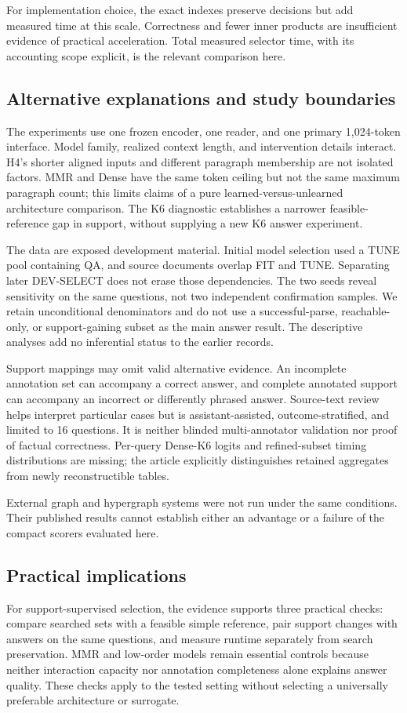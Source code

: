 \documentclass[preprint,12pt]{elsarticle}
\begin{document}
For implementation choice, the exact indexes preserve decisions but add measured time at this scale. Correctness and fewer inner products are insufficient evidence of practical acceleration. Total measured selector time, with its accounting scope explicit, is the relevant comparison here.

\subsection{Alternative explanations and study boundaries}
The experiments use one frozen encoder, one reader, and one primary 1,024-token interface. Model family, realized context length, and intervention details interact. H4's shorter aligned inputs and different paragraph membership are not isolated factors. MMR and Dense have the same token ceiling but not the same maximum paragraph count; this limits claims of a pure learned-versus-unlearned architecture comparison. The K6 diagnostic establishes a narrower feasible-reference gap in support, without supplying a new K6 answer experiment.

The data are exposed development material. Initial model selection used a TUNE pool containing QA, and source documents overlap FIT and TUNE. Separating later DEV-SELECT does not erase those dependencies. The two seeds reveal sensitivity on the same questions, not two independent confirmation samples. We retain unconditional denominators and do not use a successful-parse, reachable-only, or support-gaining subset as the main answer result. The descriptive analyses add no inferential status to the earlier records.

Support mappings may omit valid alternative evidence. An incomplete annotation set can accompany a correct answer, and complete annotated support can accompany an incorrect or differently phrased answer. Source-text review helps interpret particular cases but is assistant-assisted, outcome-stratified, and limited to 16 questions. It is neither blinded multi-annotator validation nor proof of factual correctness. Per-query Dense-K6 logits and refined-subset timing distributions are missing; the article explicitly distinguishes retained aggregates from newly reconstructible tables.

External graph and hypergraph systems were not run under the same conditions. Their published results cannot establish either an advantage or a failure of the compact scorers evaluated here.

\subsection{Practical implications}
For support-supervised selection, the evidence supports three practical checks: compare searched sets with a feasible simple reference, pair support changes with answers on the same questions, and measure runtime separately from search preservation. MMR and low-order models remain essential controls because neither interaction capacity nor annotation completeness alone explains answer quality. These checks apply to the tested setting without selecting a universally preferable architecture or surrogate.
\end{document}
